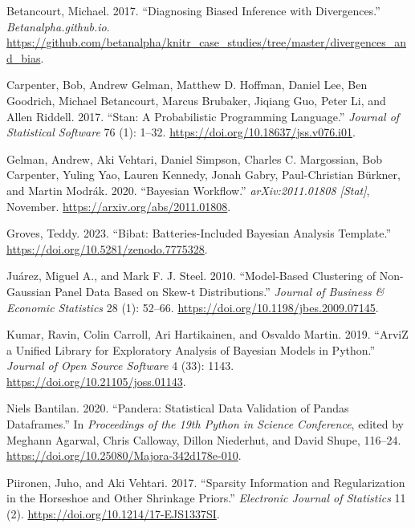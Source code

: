 \documentclass[
  letterpaper,
  DIV=11,
  numbers=noendperiod,
  oneside]{scrartcl}
\newlength{\cslhangindent}
\newenvironment{CSLReferences}[2] %
 {\begin{list}{}{%
  \setlength{\itemindent}{0pt}
  \setlength{\leftmargin}{0pt}
  \setlength{\parsep}{0pt}
  \ifodd #1
   \setlength{\leftmargin}{\cslhangindent}
   \setlength{\itemindent}{-1\cslhangindent}
  \fi
  \setlength{\itemsep}{#2\baselineskip}}}
 {\end{list}}
\theoremstyle{plain}
\theoremstyle{remark}
\begin{document}
\label{refs}
\begin{CSLReferences}{1}{0}
Betancourt, Michael. 2017. {``Diagnosing {Biased Inference} with
{Divergences}.''} \emph{Betanalpha.github.io}.
\url{https://github.com/betanalpha/knitr_case_studies/tree/master/divergences_and_bias}.

Carpenter, Bob, Andrew Gelman, Matthew D. Hoffman, Daniel Lee, Ben
Goodrich, Michael Betancourt, Marcus Brubaker, Jiqiang Guo, Peter Li,
and Allen Riddell. 2017. {``Stan: {A Probabilistic Programming
Language}.''} \emph{Journal of Statistical Software} 76 (1): 1--32.
\url{https://doi.org/10.18637/jss.v076.i01}.

Gelman, Andrew, Aki Vehtari, Daniel Simpson, Charles C. Margossian, Bob
Carpenter, Yuling Yao, Lauren Kennedy, Jonah Gabry, Paul-Christian
Bürkner, and Martin Modrák. 2020. {``Bayesian Workflow.''}
\emph{arXiv:2011.01808 {[}Stat{]}}, November.
\url{https://arxiv.org/abs/2011.01808}.

Groves, Teddy. 2023. {``Bibat: Batteries-Included Bayesian Analysis
Template.''} \url{https://doi.org/10.5281/zenodo.7775328}.

Juárez, Miguel A., and Mark F. J. Steel. 2010. {``Model-{Based
Clustering} of {Non-Gaussian Panel Data Based} on {Skew-t
Distributions}.''} \emph{Journal of Business \& Economic Statistics} 28
(1): 52--66. \url{https://doi.org/10.1198/jbes.2009.07145}.

Kumar, Ravin, Colin Carroll, Ari Hartikainen, and Osvaldo Martin. 2019.
{``{ArviZ} a Unified Library for Exploratory Analysis of {Bayesian}
Models in {Python}.''} \emph{Journal of Open Source Software} 4 (33):
1143. \url{https://doi.org/10.21105/joss.01143}.

Niels Bantilan. 2020. {``Pandera: {Statistical Data Validation} of
{Pandas Dataframes}.''} In \emph{Proceedings of the 19th {Python} in
{Science Conference}}, edited by Meghann Agarwal, Chris Calloway, Dillon
Niederhut, and David Shupe, 116--24.
\url{https://doi.org/10.25080/Majora-342d178e-010}.

Piironen, Juho, and Aki Vehtari. 2017. {``Sparsity Information and
Regularization in the Horseshoe and Other Shrinkage Priors.''}
\emph{Electronic Journal of Statistics} 11 (2).
\url{https://doi.org/10.1214/17-EJS1337SI}.


\end{CSLReferences}
\end{document}
